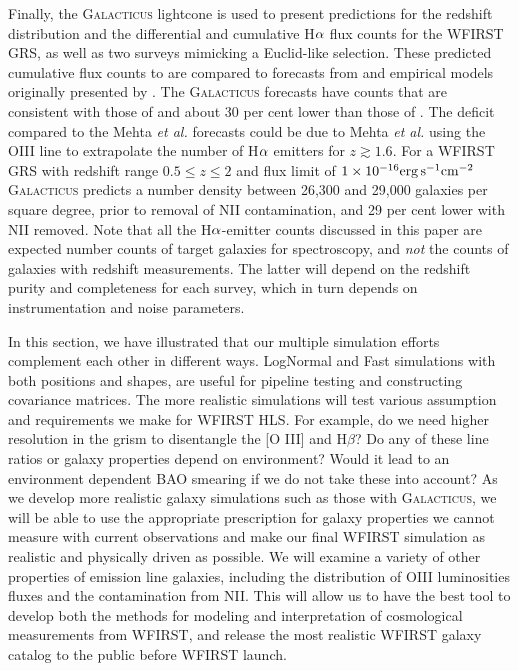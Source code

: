 Finally, the \textsc{Galacticus} lightcone is used to present predictions for
the redshift distribution and the differential and cumulative H${\rm \alpha}$
flux counts for the WFIRST GRS, as well as two surveys mimicking a Euclid-like
selection. These predicted cumulative flux counts to are compared to forecasts
from \citet{Mehta:2015} and empirical models originally presented by
\citet{Pozzetti:2016}. The \textsc{Galacticus} forecasts have counts that are
consistent with those of \citet{Pozzetti:2016} and about 30 per cent lower than
those of \citet{Mehta:2015}. The deficit compared to the Mehta \textit{et al.}
forecasts could be due to Mehta \textit{et al.} using the OIII line to
extrapolate the number of H${\rm \alpha}$ emitters for $z\gtrsim1.6$. For a
WFIRST GRS with redshift range $0.5\leqslant z\leqslant 2$ and flux limit of
$1\times 10^{-16}{\rm erg}\,{\rm s}^{-1}{\rm cm}^{-2}$ \textsc{Galacticus}
predicts a number density between 26,300 and 29,000 galaxies per square degree,
prior to removal of NII contamination, and 29 per cent lower with NII removed.
Note that all the H${\rm \alpha}$-emitter counts discussed in this paper are
expected number counts of target galaxies for spectroscopy, and \emph{not} the
counts of galaxies with redshift measurements. The latter will depend on the
redshift purity and completeness for each survey, which in turn depends on
instrumentation and noise parameters.

\begin{summary}
In this section, we have illustrated that our multiple simulation efforts
complement each other in different ways. LogNormal and Fast simulations with
both positions and shapes,  are useful for pipeline testing and constructing
covariance matrices. The more realistic simulations will test various assumption
and requirements we make for WFIRST HLS. For example, do we need higher
resolution in the grism to disentangle the [O III] and  H$\beta$? Do any of
these line ratios or galaxy properties depend on environment?  Would it lead to an environment dependent BAO smearing if we do not take these into account?  As
we develop more realistic galaxy simulations such as those with \textsc{Galacticus}, we will be able to use the appropriate prescription for
galaxy properties we cannot measure with current observations and make our final
WFIRST simulation as realistic and physically driven as possible. We will examine a variety of other properties of emission line galaxies, including the distribution of OIII luminosities fluxes and the contamination from NII.
This will allow us to have the best tool to develop both the methods for modeling and interpretation of cosmological measurements from WFIRST, and release the most
realistic WFIRST galaxy catalog to the public before WFIRST launch.
\end{summary}

